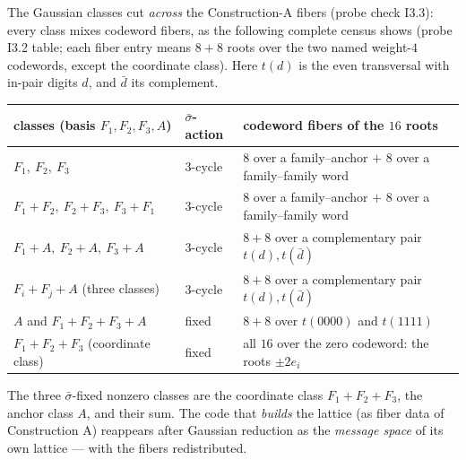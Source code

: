 \begin{remark}
\label{rem:notmod2}
The Gaussian classes cut \emph{across} the Construction-A fibers
(probe check I3.3): every class mixes codeword fibers, as the
following complete census shows (probe I3.2 table; each fiber entry
means $8+8$ roots over the two named weight-$4$ codewords, except the
coordinate class).  Here $t(d)$ is the even transversal with in-pair
digits $d$, and $\bar d$ its complement.
\begin{center}
\small
\begin{tabular}{@{}lll@{}}
\toprule
classes (basis $F_1,F_2,F_3,A$) & $\bar\sigma$-action &
codeword fibers of the $16$ roots\\
\midrule
$F_1,\ F_2,\ F_3$ & $3$-cycle &
$8$ over a family--anchor $+$ $8$ over a family--family word\\
$F_1{+}F_2,\ F_2{+}F_3,\ F_3{+}F_1$ & $3$-cycle &
$8$ over a family--anchor $+$ $8$ over a family--family word\\
$F_1{+}A,\ F_2{+}A,\ F_3{+}A$ & $3$-cycle &
$8+8$ over a complementary pair $t(d),t(\bar d)$\\
$F_i{+}F_j{+}A$ (three classes) & $3$-cycle &
$8+8$ over a complementary pair $t(d),t(\bar d)$\\
$A$ and $F_1{+}F_2{+}F_3{+}A$ & fixed &
$8+8$ over $t(0000)$ and $t(1111)$\\
$F_1{+}F_2{+}F_3$ (coordinate class) & fixed &
all $16$ over the zero codeword: the roots $\pm2e_i$\\
\bottomrule
\end{tabular}
\end{center}
The three $\bar\sigma$-fixed nonzero classes are the coordinate class
$F_1{+}F_2{+}F_3$, the anchor class $A$, and their sum.  The code
that \emph{builds} the lattice (as fiber data of Construction A)
reappears after Gaussian reduction as the \emph{message space} of its
own lattice --- with the fibers redistributed.
\end{remark}

